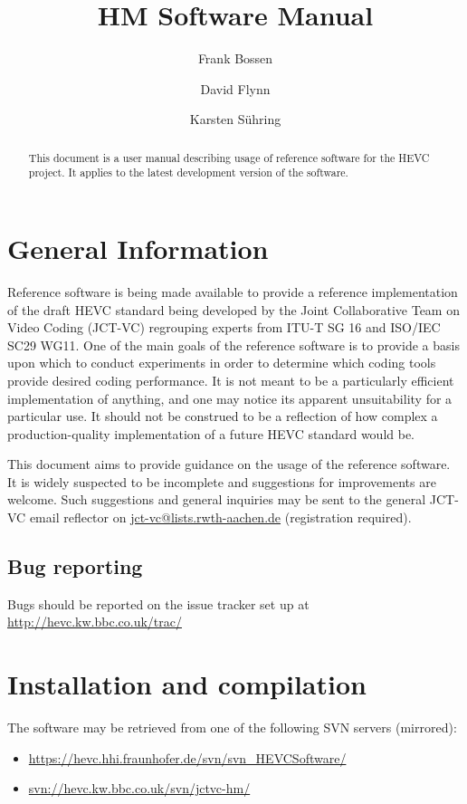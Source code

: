 \documentclass[a4paper,11pt]{jctvcdoc}
\title{HM Software Manual}
\author{%
	Frank Bossen
	\email{bossen@docomoinnovations.com}
	\and
	David Flynn
	\email{davidf@rd.bbc.co.uk}
	\and
	Karsten Sühring
	\email{Karsten.Suehring@hhi.fraunhofer.de}
}
\begin{document}
\maketitle
\begin{abstract}
This document is a user manual describing usage of reference software
for the HEVC project. It applies to the latest development version
of the software.
\end{abstract}

\tableofcontents
\listoftables

\section{General Information}
Reference software is being made available to provide a reference
implementation of the draft HEVC standard being developed by the Joint
Collaborative Team on Video Coding (JCT-VC) regrouping experts from
ITU-T SG 16 and ISO/IEC SC29 WG11. One of the main goals of the
reference software is to provide a basis upon which to conduct
experiments in order to determine which coding tools provide desired
coding performance. It is not meant to be a particularly efficient
implementation of anything, and one may notice its apparent
unsuitability for a particular use. It should not be construed to be a
reflection of how complex a production-quality implementation of a
future HEVC standard would be.

This document aims to provide guidance on the usage of the reference
software. It is widely suspected to be incomplete and suggestions for
improvements are welcome. Such suggestions and general inquiries may be
sent to the general JCT-VC email reflector on
\url{jct-vc@lists.rwth-aachen.de} (registration required).

\subsection*{Bug reporting}
Bugs should be reported on the issue tracker set up at
\url{http://hevc.kw.bbc.co.uk/trac/}

\section{Installation and compilation}
The software may be retrieved from one of the following SVN servers
(mirrored):
\begin{itemize}
\item \url{https://hevc.hhi.fraunhofer.de/svn/svn_HEVCSoftware/}
\item \url{svn://hevc.kw.bbc.co.uk/svn/jctvc-hm/}
\end{itemize}
\end{document}
